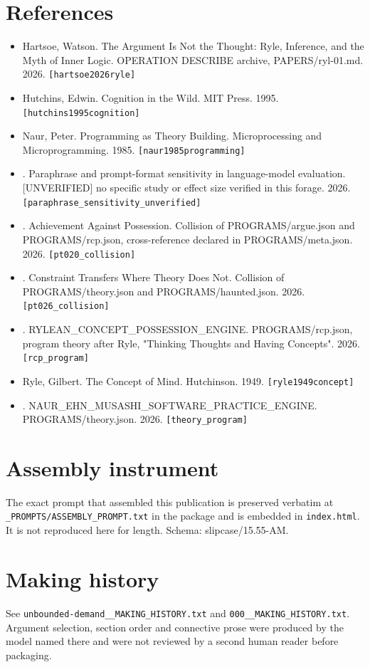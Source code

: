 \documentclass[11pt,a4paper]{article}
\begin{document}
\section*{References}\small
\begin{itemize}\setlength\itemsep{0pt}
\item Hartsoe, Watson. The Argument Is Not the Thought: Ryle, Inference, and the Myth of Inner Logic. OPERATION DESCRIBE archive, PAPERS/ryl-01.md. 2026. \texttt{[hartsoe2026ryle]}
\item Hutchins, Edwin. Cognition in the Wild. MIT Press. 1995. \texttt{[hutchins1995cognition]}
\item Naur, Peter. Programming as Theory Building. Microprocessing and Microprogramming. 1985. \texttt{[naur1985programming]}
\item [author unrecorded]. Paraphrase and prompt-format sensitivity in language-model evaluation. [UNVERIFIED] no specific study or effect size verified in this forage. 2026. \texttt{[paraphrase\_sensitivity\_unverified]}
\item [author unrecorded]. Achievement Against Possession. Collision of PROGRAMS/argue.json and PROGRAMS/rcp.json, cross-reference declared in PROGRAMS/meta.json. 2026. \texttt{[pt020\_collision]}
\item [author unrecorded]. Constraint Transfers Where Theory Does Not. Collision of PROGRAMS/theory.json and PROGRAMS/haunted.json. 2026. \texttt{[pt026\_collision]}
\item [author unrecorded]. RYLEAN\_CONCEPT\_POSSESSION\_ENGINE. PROGRAMS/rcp.json, program theory after Ryle, "Thinking Thoughts and Having Concepts". 2026. \texttt{[rcp\_program]}
\item Ryle, Gilbert. The Concept of Mind. Hutchinson. 1949. \texttt{[ryle1949concept]}
\item [author unrecorded]. NAUR\_EHN\_MUSASHI\_SOFTWARE\_PRACTICE\_ENGINE. PROGRAMS/theory.json. 2026. \texttt{[theory\_program]}
\end{itemize}\normalsize
\appendix
\section{Assembly instrument}
The exact prompt that assembled this publication is preserved verbatim at
\texttt{\_PROMPTS/ASSEMBLY\_PROMPT.txt} in the package and is embedded in \texttt{index.html}.
It is not reproduced here for length. Schema: slipcase/15.55-AM.
\section{Making history}
See \texttt{unbounded-demand\_\_MAKING\_HISTORY.txt} and \texttt{000\_\_MAKING\_HISTORY.txt}.
Argument selection, section order and connective prose were produced by the model named there
and were not reviewed by a second human reader before packaging.
\end{document}
